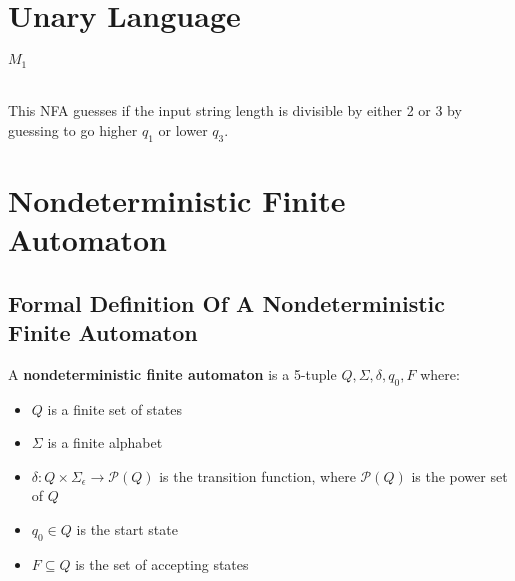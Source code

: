 \documentclass[11pt,a4paper]{article}
\begin{document}
\section{Unary Language}
\begin{example} $M_1$

     \\

    This NFA guesses if the input string length is divisible by either 2 or 3 by guessing to go higher $q_1$ or lower $q_3$.
\end{example}

\section{Nondeterministic Finite Automaton}
\subsection{Formal Definition Of A Nondeterministic Finite Automaton}
\begin{definition}
    A \textbf{nondeterministic finite automaton} is a 5-tuple $Q,\Sigma,\delta,q_0,F$ where:
    \begin{itemize}
        \item $Q$ is a finite set of states
        \item $\Sigma$ is a finite alphabet
        \item $\delta :Q\times\Sigma_{\epsilon}\rightarrow \mathcal{P}(Q)$ is the transition function, where $\mathcal{P}(Q)$ is the power set of $Q$
        \item $q_0\in Q$ is the start state
        \item $F\subseteq Q$ is the set of accepting states
    \end{itemize}
\end{definition}
\end{document}
